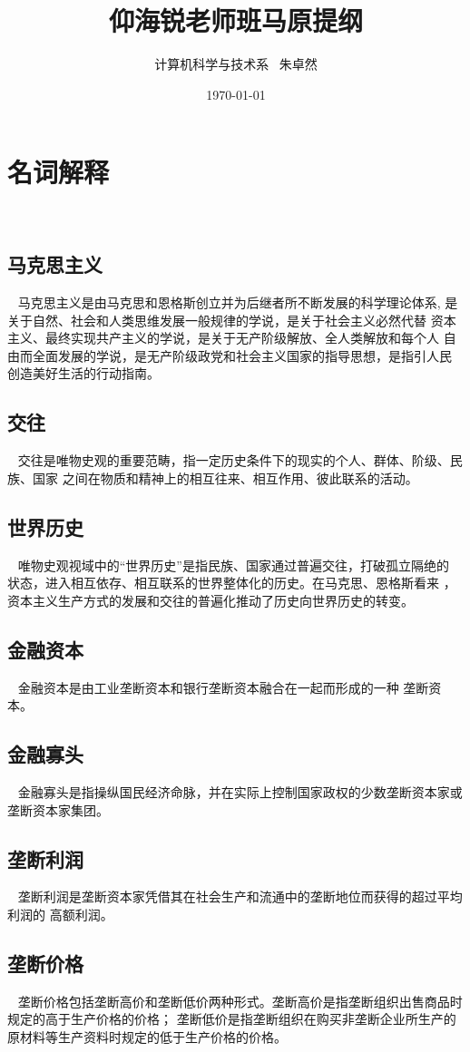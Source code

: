 \documentclass{ctexart}
\title{仰海锐老师班马原提纲}
\author{计算机科学与技术系 \ 朱卓然}
\date{\today}
\begin{document}
\maketitle

\section{名词解释}~{}
\subsection{马克思主义}~{}
马克思主义是由马克思和恩格斯创立并为后继者所不断发展的科学理论体系,
是关于自然、社会和人类思维发展一般规律的学说，是关于社会主义必然代替
资本主义、最终实现共产主义的学说，是关于无产阶级解放、全人类解放和每个人
自由而全面发展的学说，是无产阶级政党和社会主义国家的指导思想，是指引人民
创造美好生活的行动指南。

\subsection{交往}~{}
交往是唯物史观的重要范畴，指一定历史条件下的现实的个人、群体、阶级、民族、国家
之间在物质和精神上的相互往来、相互作用、彼此联系的活动。

\subsection{世界历史}~{}
唯物史观视域中的“世界历史”是指民族、国家通过普遍交往，打破孤立隔绝的
状态，进入相互依存、相互联系的世界整体化的历史。在马克思、恩格斯看来
，资本主义生产方式的发展和交往的普遍化推动了历史向世界历史的转变。

\subsection{金融资本}~{}
金融资本是由工业垄断资本和银行垄断资本融合在一起而形成的一种
垄断资本。
\subsection{金融寡头}~{}
金融寡头是指操纵国民经济命脉，并在实际上控制国家政权的少数垄断资本家或
垄断资本家集团。

\subsection{垄断利润}~{}
垄断利润是垄断资本家凭借其在社会生产和流通中的垄断地位而获得的超过平均利润的
高额利润。
\subsection{垄断价格}~{}
垄断价格包括垄断高价和垄断低价两种形式。垄断高价是指垄断组织出售商品时规定的高于生产价格的价格；
垄断低价是指垄断组织在购买非垄断企业所生产的原材料等生产资料时规定的低于生产价格的价格。
\vspace{+10mm}
\end{document}
